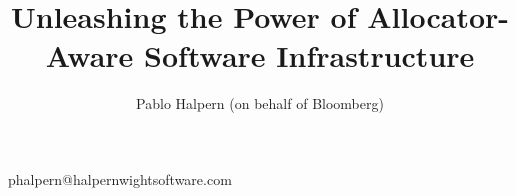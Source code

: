 
\title{Unleashing the Power of Allocator-Aware Software Infrastructure}
\author{Pablo Halpern (on behalf of Bloomberg)}{phalpern@halpernwightsoftware.com}
